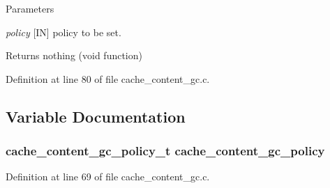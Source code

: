 \begin{DoxyParams}{Parameters}
\item[{\em policy}][IN] policy to be set.\end{DoxyParams}
\begin{DoxyReturn}{Returns}
nothing (void function) 
\end{DoxyReturn}


Definition at line 80 of file cache\_\-content\_\-gc.c.

\subsection{Variable Documentation}
\subsubsection[{cache\_\-content\_\-gc\_\-policy}]{\setlength{\rightskip}{0pt plus 5cm}cache\_\-content\_\-gc\_\-policy\_\-t {\bf cache\_\-content\_\-gc\_\-policy}}\label{cache__content__gc_8c_aff0b79775409d0858d24af52abdcc2d5}


Definition at line 69 of file cache\_\-content\_\-gc.c.